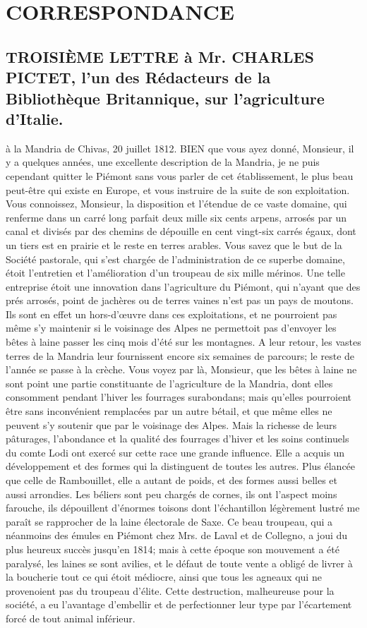 \setcounter{page}{427}
\chapter{CORRESPONDANCE}
\section{TROISIÈME LETTRE à Mr. CHARLES PICTET, l'un des Rédacteurs de la Bibliothèque Britannique, sur l'agriculture d'Italie.}
à la Mandria de Chivas, 20 juillet 1812.
BIEN que vous ayez donné, Monsieur, il y a quelques années, une excellente description de la Mandria, je ne puis cependant quitter le Piémont sans vous parler de cet établissement, le plus beau peut-être qui existe en Europe, et vous instruire de la suite de son exploitation.
Vous connoissez, Monsieur, la disposition et l'étendue de ce vaste domaine, qui renferme dans un carré long parfait deux mille six cents arpens, arrosés par un canal et divisés par des chemins de dépouille en cent vingt-six carrés égaux, dont un tiers est en prairie et le reste en terres arables.
\setcounter{page}{428} Vous savez que le but de la Société pastorale, qui s'est chargée de l'administration de ce superbe domaine, étoit l'entretien et l'amélioration d'un troupeau de six mille mérinos.
Une telle entreprise étoit une innovation dans l'agriculture du Piémont, qui n'ayant que des prés arrosés, point de jachères ou de terres vaines n'est pas un pays de moutons. Ils sont en effet un hors-d'œuvre dans ces exploitations, et ne pourroient pas même s'y maintenir si le voisinage des Alpes ne permettoit pas d'envoyer les bêtes à laine passer les cinq mois d'été sur les montagnes. A leur retour, les vastes terres de la Mandria leur fournissent encore six semaines de parcours; le reste de l'année se passe à la crèche. Vous voyez par là, Monsieur, que les bêtes à laine ne sont point une partie constituante de l'agriculture de la Mandria, dont elles consomment pendant l'hiver les fourrages surabondans; mais qu'elles pourroient être sans inconvénient remplacées par un autre bétail, et que même elles ne peuvent s'y soutenir que par le voisinage des Alpes.
Mais la richesse de leurs pâturages, l'abondance et la qualité des fourrages d'hiver\setcounter{page}{429} et les soins continuels du comte Lodi ont exercé sur cette race une grande influence. Elle a acquis un développement et des formes qui la distinguent de toutes les autres. Plus élancée que celle de Rambouillet, elle a autant de poids, et des formes aussi belles et aussi arrondies. Les béliers sont peu chargés de cornes, ils ont l'aspect moins farouche, ils dépouillent d'énormes toisons dont l'échantillon légèrement lustré me paraît se rapprocher de la laine électorale de Saxe. Ce beau troupeau, qui a néanmoins des émules en Piémont chez Mrs. de Laval et de Collegno, a joui du plus heureux succès jusqu'en 1814; mais à cette époque son mouvement a été paralysé, les laines se sont avilies, et le défaut de toute vente a obligé de livrer à la boucherie tout ce qui étoit médiocre, ainsi que tous les agneaux qui ne provenoient pas du troupeau d'élite. Cette destruction, malheureuse pour la société, a eu l'avantage d'embellir et de perfectionner leur type par l'écartement forcé de tout animal inférieur.
